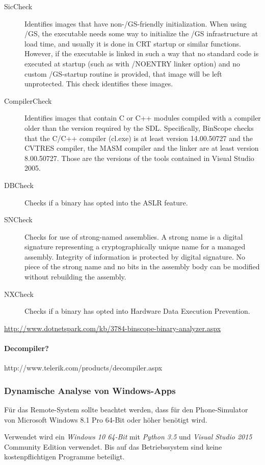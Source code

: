 \begin{description}
	\item[SicCheck]  Identifies images that have non-/GS-friendly initialization. When using /GS, the executable needs some way to initialize the /GS infrastructure at load time, and usually it is done in CRT startup or similar functions. However, if the executable is linked in such a way that no standard code is executed at startup (such as with /NOENTRY linker option) and no custom /GS-startup routine is provided, that image will be left unprotected. This check identifies these images.
	\item[CompilerCheck] Identifies images that contain C or C++ modules compiled with a compiler older than the version required by the SDL. Specifically, BinScope checks that the C/C++ compiler (cl.exe) is at least version 14.00.50727 and the CVTRES compiler, the MASM compiler and the linker are at least version 8.00.50727. Those are the versions of the tools contained in Visual Studio 2005.
	\item[DBCheck] Checks if a binary has opted into the ASLR feature.
	\item[SNCheck] Checks for use of strong-named assemblies. A strong name is a digital signature representing a cryptographically unique name for a managed assembly. Integrity of information is protected by digital signature. No piece of the strong name and no bits in the assembly body can be modified without rebuilding the assembly.
  \item[NXCheck] Checks if a binary has opted into Hardware Data Execution Prevention.
\end{description}
\url{http://www.dotnetspark.com/kb/3784-binscope-binary-analyzer.aspx}

\paragraph{Decompiler?}
http://www.telerik.com/products/decompiler.aspx


\subsubsection{Dynamische Analyse von Windows-Apps}
Für das Remote-System sollte beachtet werden, dass für den Phone-Simulator von Microsoft Windows 8.1 Pro 64-Bit oder höher benötigt wird.

Verwendet wird ein \textit{Windows 10 64-Bit} mit \textit{Python 3.5} und \textit{Visual Studio 2015} Community Edition verwendet. Bis auf das Betriebssystem sind keine kostenpflichtigen Programme beteiligt.


